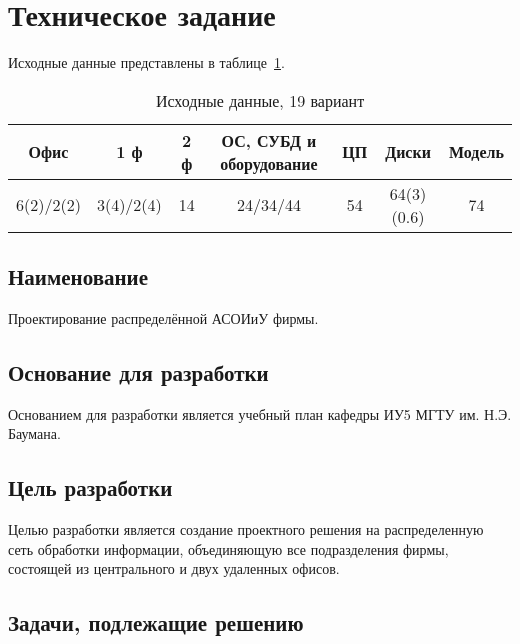 \newpage

\section{Техническое задание}

Исходные данные представлены в таблице~\ref{table:ishodn_dann}.

\begin{table}[ht]
\caption{Исходные данные, 19 вариант}
\label{table:ishodn_dann}
\centering
 \begin{tabular}{|c|c|c|c|c|c|c|}
 \hline Офис & 1 ф & 2 ф & ОС, СУБД и оборудование & ЦП & Диски & Модель \\
 \hline 6(2)/2(2) & 3(4)/2(4) & 14 & 24/34/44 & 54 & 64(3)(0.6) & 74 \\
 \hline
 \end{tabular}
\end{table}

\subsection{Наименование}

Проектирование распределённой АСОИиУ фирмы.

\subsection{Основание для разработки}

Основанием для разработки является учебный план кафедры ИУ5 МГТУ им. Н.Э. Баумана. 

\subsection{Цель разработки}

Целью разработки является создание проектного решения на распределенную сеть обработки информации, объединяющую все подразделения фирмы, состоящей из центрального и двух удаленных офисов.

\subsection{Задачи, подлежащие решению}

